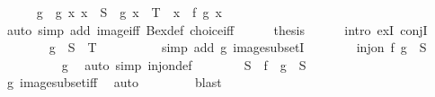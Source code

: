 \begin{isabellebody}
\ \ \ \ \isamarkupfalse%
\ g\ \ g{\isacharcolon}{\kern0pt}\ {\isachardoublequoteopen}{\isasymAnd}x{\isachardot}{\kern0pt}\ x\ {\isasymin}\ S\ {\isasymLongrightarrow}\ g\ x\ {\isasymin}\ T\ {\isasymand}\ x\ {\isacharequal}{\kern0pt}\ f\ {\isacharparenleft}{\kern0pt}g\ x{\isacharparenright}{\kern0pt}{\isachardoublequoteclose}\isanewline
\ \ \ \ \ \ \isamarkupfalse%
\ {\isacharparenleft}{\kern0pt}auto\ simp\ add{\isacharcolon}{\kern0pt}\ image{\isacharunderscore}{\kern0pt}iff\ Bex{\isacharunderscore}{\kern0pt}def\ choice{\isacharunderscore}{\kern0pt}iff{\isacharprime}{\kern0pt}{\isacharparenright}{\kern0pt}\isanewline
\ \ \ \ \isamarkupfalse%
\ {\isacharquery}{\kern0pt}thesis\isanewline
\ \ \ \ \isamarkupfalse%
\ {\isacharparenleft}{\kern0pt}intro\ exI\ conjI{\isacharparenright}{\kern0pt}\isanewline
\ \ \ \ \ \ \isamarkupfalse%
\ {\isachardoublequoteopen}g\ {\isacharbackquote}{\kern0pt}\ S\ {\isasymsubseteq}\ T{\isachardoublequoteclose}\isanewline
\ \ \ \ \ \ \ \ \isamarkupfalse%
\ {\isacharparenleft}{\kern0pt}simp\ add{\isacharcolon}{\kern0pt}\ g\ image{\isacharunderscore}{\kern0pt}subsetI{\isacharparenright}{\kern0pt}\isanewline
\ \ \ \ \ \ \isamarkupfalse%
\ {\isachardoublequoteopen}inj{\isacharunderscore}{\kern0pt}on\ f\ {\isacharparenleft}{\kern0pt}g\ {\isacharbackquote}{\kern0pt}\ S{\isacharparenright}{\kern0pt}{\isachardoublequoteclose}\isanewline
\ \ \ \ \ \ \ \ \isamarkupfalse%
\ g\ \isamarkupfalse%
\ {\isacharparenleft}{\kern0pt}auto\ simp{\isacharcolon}{\kern0pt}\ inj{\isacharunderscore}{\kern0pt}on{\isacharunderscore}{\kern0pt}def{\isacharparenright}{\kern0pt}\isanewline
\ \ \ \ \ \ \isamarkupfalse%
\ {\isachardoublequoteopen}S\ {\isacharequal}{\kern0pt}\ f\ {\isacharbackquote}{\kern0pt}\ {\isacharparenleft}{\kern0pt}g\ {\isacharbackquote}{\kern0pt}\ S{\isacharparenright}{\kern0pt}{\isachardoublequoteclose}\isanewline
\ \ \ \ \ \ \ \ \isamarkupfalse%
\ g\ image{\isacharunderscore}{\kern0pt}subset{\isacharunderscore}{\kern0pt}iff\ \isamarkupfalse%
\ auto\isanewline
\ \ \ \ \isamarkupfalse%
\isanewline
\ \ \isamarkupfalse%
\isanewline
{}\isamarkupfalse%
\ blast%
\endisatagproof
{\isafoldproof}%
%
\isadelimproof
%
\endisadelimproof
%
\isadelimdocument
%
\endisadelimdocument
%
\isatagdocument
%
\isamarkuptrue%
%
\endisatagdocument

\end{isabellebody}
